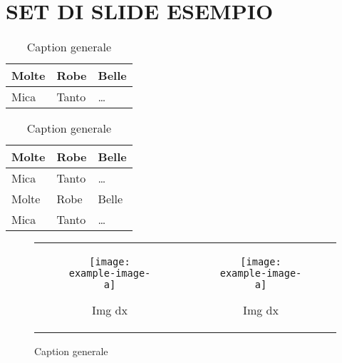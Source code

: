 \def \NUMSLIDES {123}

\section{SET DI SLIDE ESEMPIO}

\lipsum[1]


\lipsum[1]
\lipsum[2]



\begin{table}[!htb]
  \caption{Caption generale}
  \begin{adjustwidth}{0cm}{} %

    \begin{minipage}{.5\linewidth}
      \centering
      \vspace{-2.2em} %
      \begin{tabular}{l|l|l}
        Molte    & Robe   & Belle    \\ \hline
        Mica     & Tanto  & \dots    \\
      \end{tabular}

    \end{minipage}
    \begin{minipage}{.5\linewidth}
      \centering
      \begin{tabular}{l|l|l}
        Molte    & Robe   & Belle    \\ \hline
        Mica     & Tanto  & \dots    \\
        Molte    & Robe   & Belle    \\ \hline
        Mica     & Tanto  & \dots    \\
      \end{tabular}

    \end{minipage} 
  \end{adjustwidth}
\end{table}


\begin{figure}[!htb]
  \centering
  \begin{tabular}[t]{cc}
    \begin{subfigure}{0.4\textwidth}
      \centering
      \texttt{[image: example-image-a]}
      \captionsetup{width=0.9\linewidth}
      \caption{Img dx}
    \end{subfigure}
    &
    \begin{subfigure}{0.4\textwidth}
      \centering
      \texttt{[image: example-image-a]}
      \captionsetup{width=.9\linewidth}
      \caption{Img dx}
    \end{subfigure}
  \end{tabular}
  \caption{Caption generale}
\end{figure}
